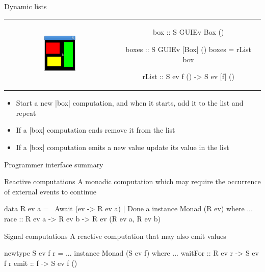 \documentclass{beamer}
\begin{document}
\begin{frame}{Dynamic lists}
\begin{tabular}{c c}
   \includegraphics[width=0.3\textwidth]{05.png} &
 \begin{minipage}[b]{0.5\textwidth}
\begin{code}
box   :: S GUIEv Box ()

boxes :: S GUIEv [Box] ()
boxes = rList box

rList :: S ev f () -> S ev [f] ()

\end{code}
\end{minipage}
\end{tabular}





\begin{itemize}
\item Start a new |box| computation, and when it starts, add it to the list and repeat
\item If a |box| computation ends remove it from the list
\item If a |box| computation emits a new value update its value in the list
\end{itemize}
\end{frame}

\begin{frame}{Programmer interface summary}
\begin{block}{Reactive computations}
A monadic computation which may require the occurrence of external events to continue
\begin{code}
data R ev a =~ Await (ev -> R ev a) | Done a
instance Monad (R ev) where ...
race :: R ev a -> R ev b -> R ev (R ev a, R ev b)
\end{code}
\end{block}
\begin{block}{Signal computations}
A reactive computation that may also emit values
\begin{code}
newtype S ev f r = ...
instance Monad (S ev f) where ...
waitFor   :: R ev r -> S ev f r
emit      :: f -> S ev f ()
\end{code}
\end{block}
\end{frame}
\end{document}
